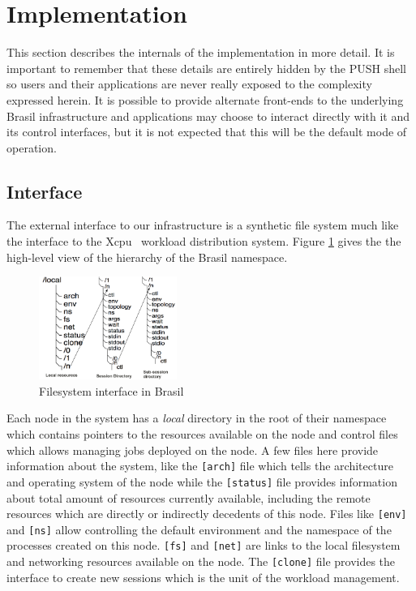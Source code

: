 \section{Implementation}

This section describes the internals of the implementation in more
detail.  It is important to remember that these details are entirely
hidden by the PUSH shell so users and their applications are never
really exposed to the complexity expressed herein.  It is possible
to provide alternate front-ends to the underlying Brasil infrastructure
and applications may choose to interact directly with it and its control
interfaces, but it is not expected that this will be the default mode of 
operation.

\subsection{Interface}

The external interface to our infrastructure is a synthetic file system
much like the interface to the Xcpu~\cite{lucho-xcpu} workload distribution
system.  
Figure \ref{fig:xcpu3Local} gives the the high-level view of the hierarchy 
of the Brasil namespace.

\begin{figure}[h]
  \begin{center}
    \leavevmode
      \includegraphics[height=0.25\textheight,width=0.4\textwidth]
		{./img/local_session_subsessions}
    \caption{Filesystem interface in Brasil}
    \label{fig:xcpu3Local}
  \end{center}
\end{figure}

Each node in the system has a \emph{local} directory in the root of their
namespace which contains pointers to the resources
available on the node and control files which allows managing 
jobs deployed on the node.
A few files here provide information about the system, like the
\texttt{[arch]} file which tells the architecture and operating system of 
the node while the \texttt{[status]} file provides information about total 
amount of resources currently available, including the remote resources which 
are directly or indirectly decedents of this node.  
Files like \texttt{[env]} and \texttt{[ns]}
allow controlling the default environment and the namespace of the processes
created on this node.  \texttt{[fs]} and \texttt{[net]} are links to the local
filesystem and networking resources available on the node.  The
\texttt{[clone]} file provides the interface to create new sessions which is
the unit of the workload management.

